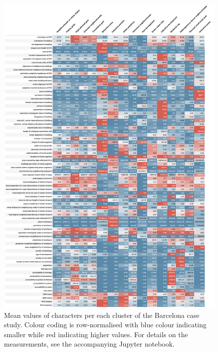 \begin{figure}
  \includegraphics[width=\linewidth]{figures/barcelona_means.png}
  \caption{Mean values of characters per each cluster of the Barcelona case study.
  Colour coding is row-normalised with blue colour indicating smaller while red indicating
  higher values. For details on the measurements, see the accompanying Jupyter notebook.
  }
  \label{fig:means_bcn}
\end{figure}

